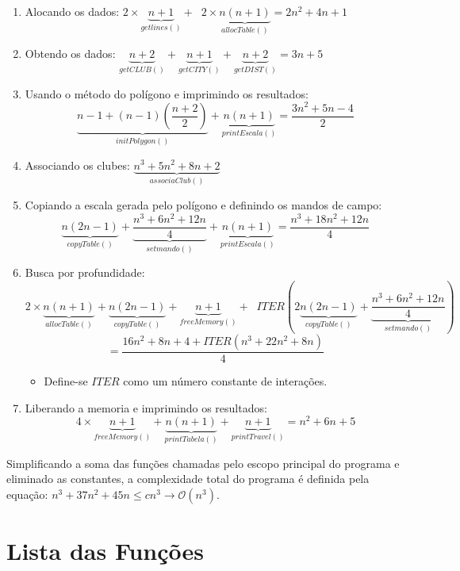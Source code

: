 \documentclass[12pt,a4paper]{article}
\numberwithin{figure}{section}
\numberwithin{table}{section}
\begin{document}
\begin{enumerate}
\setlength\itemsep{1pt}
	\item Alocando os dados: $ 2 \times \underbrace{n+1}_{getlines()} + \;\; 2 \times \underbrace{n(n+1)}_{allocTable()} = 2n^2 + 4n +1 $
	
	\item Obtendo os dados: $ \underbrace{n+2}_{getCLUB()} + \underbrace{n+1}_{getCITY()} + \underbrace{n+2}_{getDIST()} = 3n + 5 $
	
	\item Usando o método do polígono e imprimindo os resultados: \[ \underbrace{n-1 + (n-1)(\frac{n+2}{2})}_{initPolygon()} + \underbrace{n(n+1)}_{printEscala()} = \frac{3n^2 + 5n -4}{2} \]
	
	\item Associando os clubes: $ \underbrace{n^3 + 5n^2 + 8n + 2}_{associaClub()} $
	
	\item Copiando a escala gerada pelo polígono e definindo os mandos de campo: \[ \underbrace{n(2n-1)}_{copyTable()} + \underbrace{\frac{n^3 + 6n^2 + 12n}{4}}_{setmando()} + \underbrace{n(n+1)}_{printEscala()} = \frac{n^3 + 18n^2 + 12n}{4} \]
	
	\item Busca por profundidade: \[ 2 \times \underbrace{n(n+1)}_{allocTable()} + \underbrace{n(2n-1)}_{copyTable()} + \underbrace{n+1}_{freeMemory()} + \;\; ITER(2\underbrace{n(2n-1)}_{copyTable()} + \underbrace{\frac{n^3 + 6n^2 + 12n}{4}}_{setmando()}) \] \[ = \frac{16n^2 + 8n + 4 + ITER(n^3 + 22n^2 + 8n)}{4} \]
	\begin{itemize}
		\item Define-se $ITER$ como um número constante de interações.
	\end{itemize}
	
	\item Liberando a memoria e imprimindo os resultados: \[ 4 \times \underbrace{n+1}_{freeMemory()} + \underbrace{n(n+1)}_{printTabela()} + \underbrace{n+1}_{printTravel()} = n^2 + 6n + 5 \]
\end{enumerate}

Simplificando a soma das funções chamadas pelo escopo principal do programa e eliminado as constantes, a complexidade total do programa é definida pela equação: $ n^3 + 37n^2 + 45n \leqslant cn^3 \rightarrow \mathcal{O}(n^3) $.

\section{Lista das Funções}
\end{document}
